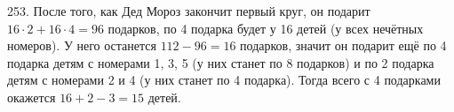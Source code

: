 253. После того, как Дед Мороз закончит первый круг, он подарит $16\cdot2+16\cdot4=96$ подарков, по 4 подарка будет у 16 детей (у всех нечётных номеров). У него останется $112-96=16$ подарков, значит он подарит ещё по 4 подарка детям с номерами 1, 3, 5 (у них станет по 8 подарков) и по 2 подарка детям с номерами 2 и 4 (у них станет по 4 подарка). Тогда всего с 4 подарками окажется $16+2-3=15$ детей.\\
